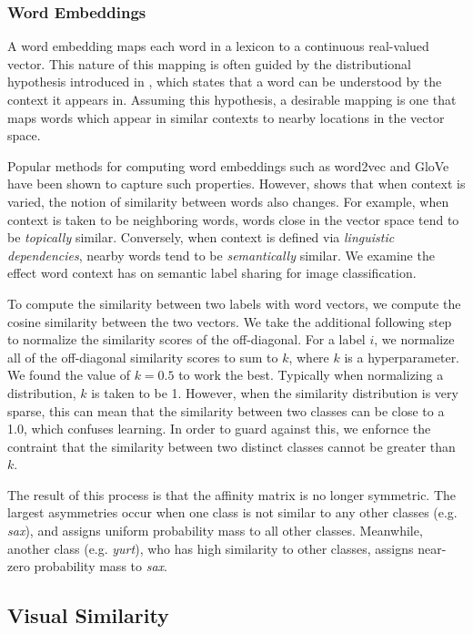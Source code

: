 \subsubsection{Word Embeddings} \label{word2vec}

A word embedding maps each word in a lexicon to a continuous
real-valued vector. This nature of this mapping is often guided by the
distributional hypothesis introduced in
\cite{harris1954distributional}, which states that a word can be
understood by the context it appears in. Assuming this hypothesis, a
desirable mapping is one that maps words which appear in similar
contexts to nearby locations in the vector space.

Popular methods for computing word embeddings such as word2vec
\cite{mikolov2013distributed} and GloVe \cite{pennington2014glove} have been
shown to capture such properties.  However, \cite{levy2014dependency} shows that
when context is varied, the notion of similarity between words also changes. For
example, when context is taken to be neighboring words, words close in the
vector space tend to be \emph{topically} similar. Conversely, when context is
defined via \emph{linguistic dependencies}, nearby words tend to be
\emph{semantically} similar. We examine the effect word context has on semantic
label sharing for image classification.

To compute the similarity between two labels with word vectors, we compute the
cosine similarity between the two vectors. We take the additional following step
to normalize the similarity scores of the off-diagonal. For a label $i$, we
normalize all of the off-diagonal similarity scores to sum to $k$, where $k$ is
a hyperparameter. We found the value of $k = 0.5$ to work the best. Typically
when normalizing a distribution, $k$ is taken to be 1. However, when the
similarity distribution is very sparse, this can mean that the similarity
between two classes can be close to a 1.0, which confuses learning. In order to
guard against this, we enfornce the contraint that the similarity between two
distinct classes cannot be greater than $k$.

The result of this process is that the affinity matrix is no longer symmetric.
The largest asymmetries occur when one class is not similar to any other classes
(e.g. \emph{sax}), and assigns uniform probability mass to all other classes.
Meanwhile, another class (e.g. \emph{yurt}), who has high similarity to other
classes, assigns near-zero probability mass to \emph{sax}.

\subsection{Visual Similarity}

